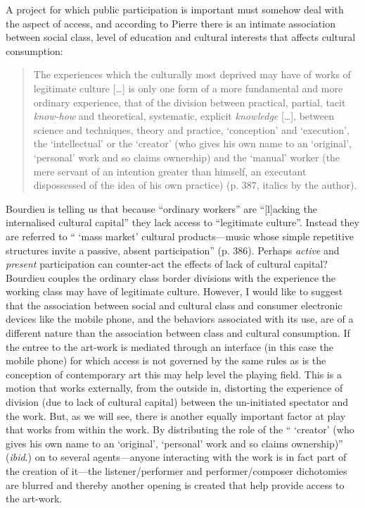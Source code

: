 A project for which public participation is important must somehow deal with the aspect of access, and according to Pierre \citet{bourdieu} there is an intimate association between social class, level of education and cultural interests that affects cultural consumption:
\begin{quote}
The experiences which the culturally most deprived may have of works of legitimate culture [\ldots] is only one form of a more fundamental and more ordinary experience, that of the division between practical, partial, tacit \textit{know-how} and theoretical, systematic, explicit \textit{knowledge} [\ldots], between science and techniques, theory and practice, `conception' and `execution', the `intellectual' or the `creator' (who gives his own name to an `original', `personal' work and so claims ownership) and the `manual' worker (the mere servant of an intention greater than himself, an executant dispossessed of the idea of his own practice) (p. 387, italics by the author). 
\end{quote}
Bourdieu is telling us that because ``ordinary workers'' are ``[l]acking the internalised cultural capital'' they lack access to ``legitimate culture''. Instead they are referred to `` `mass market' cultural products---music whose simple repetitive structures invite a passive, absent participation'' (p. 386). Perhaps \emph{active} and \emph{present} participation can counter-act the effects of lack of cultural capital? Bourdieu couples the ordinary class border divisions with the experience the working class may have of legitimate culture. However, I would like to suggest that the association between social and cultural class and consumer electronic devices like the mobile phone, and the behaviors associated with its use, are of a different nature than the association between class and cultural consumption. If the entree to the art-work is mediated through an interface (in this case the mobile phone) for which access is not governed by the same rules as is the conception of contemporary art this may help level the playing field. 
This is a motion that works externally, from the outside in, distorting the experience of division (due to lack of cultural capital) between the un-initiated spectator and the work. But, as we will see, there is another equally important factor at play that works from within the work. By distributing the role of the `` `creator' (who gives his own name to an `original', `personal' work and so claims ownership)'' (\emph{ibid}.) on to several agents---anyone interacting with the work is in fact part of the creation of it---the listener/performer and performer/composer dichotomies are blurred and thereby another opening is created that help provide access to the art-work. 

